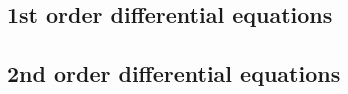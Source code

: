 \documentclass{article}
\begin{document}
\begin{multicols*}{2}
\subsection{1st order differential equations}

\subsection{2nd order differential equations}


\end{multicols*}
\end{document}
